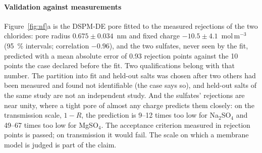 \documentclass[preprint,12pt]{elsarticle}
\begin{document}
\paragraph{Validation against measurements}  Figure~\ref{fig:nf}a is the
DSPM-DE pore fitted to the measured rejections of the two chlorides: pore
radius $0.675\pm0.034$~nm and fixed charge $-10.5\pm4.1$~mol\,m$^{-3}$
(95~\% intervals; correlation $-0.96$), and the two sulfates, never seen by
the fit, predicted with a mean absolute error of 0.93 rejection points
against the 10 points the case declared before the fit.  Two qualifications
belong with that number.  The partition into fit and held-out salts was
chosen after two others had been measured and found not identifiable (the
case says so), and held-out salts of the same study are not an independent
study.  And the sulfates' rejections are near unity, where a tight pore of
almost any charge predicts them closely: on the transmission scale, $1-R$,
the prediction is 9--12 times too low for Na$_2$SO$_4$ and 49--67 times too
low for MgSO$_4$.  The acceptance criterion measured in rejection points
is passed; on transmission it would fail.  The scale on which a membrane
model is judged is part of the claim.
\end{document}
